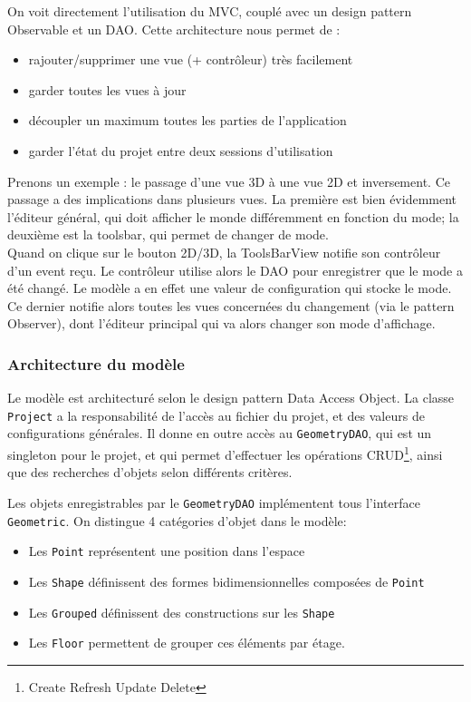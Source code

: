 	On voit directement l'utilisation du MVC, couplé avec un design pattern
	Observable et un DAO. Cette architecture nous permet de :
	\begin{itemize}
		\item rajouter/supprimer une vue (+ contrôleur) très facilement
		\item garder toutes les vues à jour
		\item découpler un maximum toutes les parties de l'application
		\item garder l'état du projet entre deux sessions d'utilisation
	\end{itemize}

	Prenons un exemple : le passage d'une vue 3D à une vue 2D et inversement.
	Ce passage a des implications dans plusieurs vues. La première est
	bien évidemment l'éditeur général, qui doit afficher le monde différemment
	en fonction du mode; la deuxième est la toolsbar, qui permet de changer de
	mode.\\

	Quand on clique sur le bouton 2D/3D, la ToolsBarView notifie son contrôleur
	d'un event reçu. Le contrôleur utilise alors le DAO pour enregistrer que
	le mode a été changé. Le modèle a en effet une valeur de configuration qui
	stocke le mode. Ce dernier notifie alors toutes les vues concernées du 
	changement (via le pattern Observer), dont l'éditeur principal qui va alors
	changer son mode d'affichage.\\

	\subsubsection{Architecture du modèle}
	Le modèle est architecturé selon le design pattern Data Access Object.
	La classe \texttt{Project} a la responsabilité de l'accès au fichier du
	projet, et des valeurs de configurations générales. Il donne en outre accès
	au \texttt{GeometryDAO}, qui est un singleton pour le projet, et qui permet
	d'effectuer les opérations CRUD\footnote{Create Refresh Update Delete},
	ainsi que des recherches d'objets selon différents critères.

	Les objets enregistrables par le \texttt{GeometryDAO} implémentent tous
	l'interface \texttt{Geometric}. On distingue 4 catégories d'objet dans le
	modèle:

	\begin{itemize}
		\item Les \texttt{Point} représentent une position dans l'espace
		\item Les \texttt{Shape} définissent des formes bidimensionnelles 
		      composées de \texttt{Point}
		\item Les \texttt{Grouped} définissent des constructions sur les 
		      \texttt{Shape}
		\item Les \texttt{Floor} permettent de grouper ces éléments par étage.
	\end{itemize}

